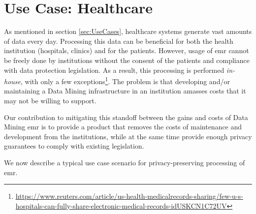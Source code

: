
\section{Use Case: Healthcare}
\label{sec:usecaseHealthcare}


As mentioned in section \ref{sec:UseCases}, healthcare systems generate vast amounts of data every day. Processing this data can be beneficial for both the health institution (hospitals, clinics) and for the patients. However, usage of \ac{emr} cannot be freely done by institutions without the consent of the patients and compliance with data protection legislation. As a result, this processing is performed \textit{in-house}, with only a few exceptions\footnote{\url{https://www.reuters.com/article/us-health-medicalrecords-sharing/few-u-s-hospitals-can-fully-share-electronic-medical-records-idUSKCN1C72UV}}. The problem is that developing and/or maintaining a Data Mining infrastructure in an institution amasses costs that it may not be willing to support.

Our contribution to mitigating this standoff between the gains and costs of Data Mining \ac{emr} is to provide a product that removes the costs of maintenance and development from the institutions, while at the same time provide enough privacy guarantees to comply with existing legislation.


We now describe a typical use case scenario for privacy-preserving processing of \ac{emr}.

